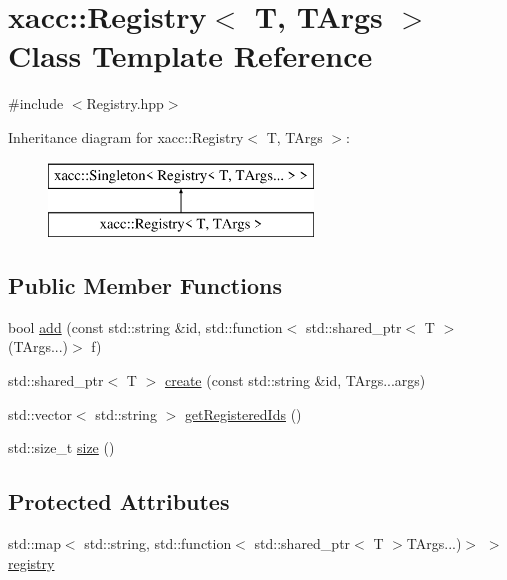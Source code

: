 \hypertarget{a00248}{}\section{xacc\+:\+:Registry$<$ T, T\+Args $>$ Class Template Reference}
\label{a00248}


{\ttfamily \#include $<$Registry.\+hpp$>$}

Inheritance diagram for xacc\+:\+:Registry$<$ T, T\+Args $>$\+:\begin{figure}[H]
\begin{center}
\leavevmode
\includegraphics[height=2.000000cm]{a00248}
\end{center}
\end{figure}
\subsection*{Public Member Functions}
\begin{DoxyCompactItemize}
\item 
bool \hyperlink{a00248_a9aa172c2603171db067b40bd62ba53c6}{add} (const std\+::string \&id, std\+::function$<$ std\+::shared\+\_\+ptr$<$ T $>$(T\+Args...)$>$ f)
\item 
std\+::shared\+\_\+ptr$<$ T $>$ \hyperlink{a00248_aecccbd5534276cbdd1553e43c942219b}{create} (const std\+::string \&id, T\+Args...\+args)
\item 
std\+::vector$<$ std\+::string $>$ \hyperlink{a00248_a8bff6f5c50534375abc4026662d69d2e}{get\+Registered\+Ids} ()
\item 
std\+::size\+\_\+t \hyperlink{a00248_a2352dd7c6c85ae5c5e232b577dfa2544}{size} ()
\end{DoxyCompactItemize}
\subsection*{Protected Attributes}
\begin{DoxyCompactItemize}
\item 
std\+::map$<$ std\+::string, std\+::function$<$ std\+::shared\+\_\+ptr$<$ T $>$T\+Args...)$>$ $>$ \hyperlink{a00248_a46460ecacc7facb6936b3c1ec6d618d7}{registry}
\end{DoxyCompactItemize}
